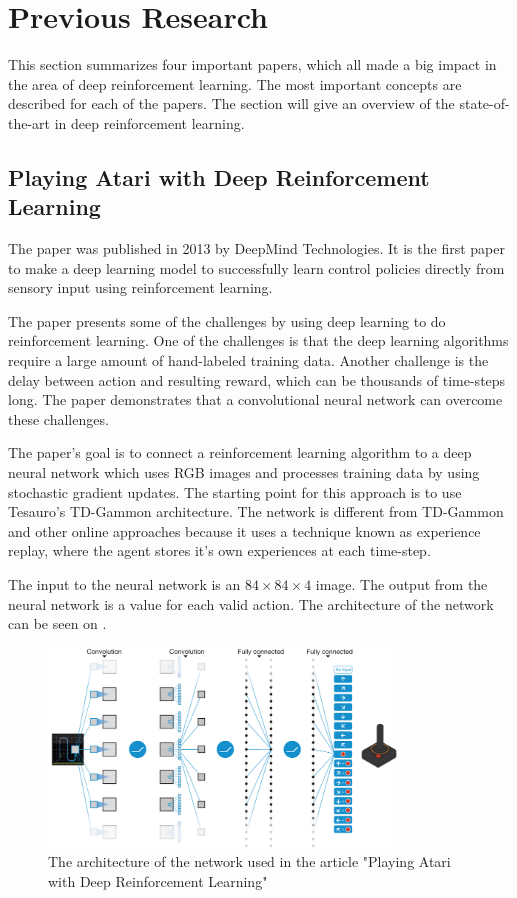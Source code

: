 \section{Previous Research}
\label{Previous_Research}
This section summarizes four important papers, which all made a big impact in the area of deep reinforcement learning. The most important concepts are described for each of the papers. The section will give an overview of the state-of-the-art in deep reinforcement learning.    

\subsection{Playing Atari with Deep Reinforcement Learning }
The paper \cite{DBLP:journals/corr/MnihKSGAWR13} was published in 2013 by DeepMind Technologies. It is the first paper to make a deep learning model to successfully learn control policies directly from sensory input using reinforcement learning. 

The paper presents some of the challenges by using deep learning to do reinforcement learning. One of the challenges is that the deep learning algorithms require a large amount of hand-labeled training data. Another challenge is the delay between action and resulting reward, which can be thousands of time-steps long. The paper demonstrates that a convolutional neural network can overcome these challenges.  

The paper's goal is to connect a reinforcement learning algorithm to a deep neural network which uses RGB images and processes training data by using stochastic gradient updates. The starting point for this approach is to use Tesauro's TD-Gammon \cite{Tesauro:1995:TDL:203330.203343} architecture. The network is different from TD-Gammon and other online approaches because it uses a technique known as experience replay, where the agent stores it's own experiences at each time-step.

The input to the neural network is an $84 \times 84 \times 4$ image. The output from the neural network is a value for each valid action. The architecture of the network can be seen on .
   
\begin{figure}[H]
	\centering
	\includegraphics[width=0.825\textwidth]{Figures/TheoreticalBackground/playing_atari.jpg}
	\caption{The architecture of the network used in the article "Playing Atari with Deep Reinforcement Learning" \cite{DBLP:journals/corr/MnihKSGAWR13}}
	\label{fig:playing_atari}
\end{figure} 

